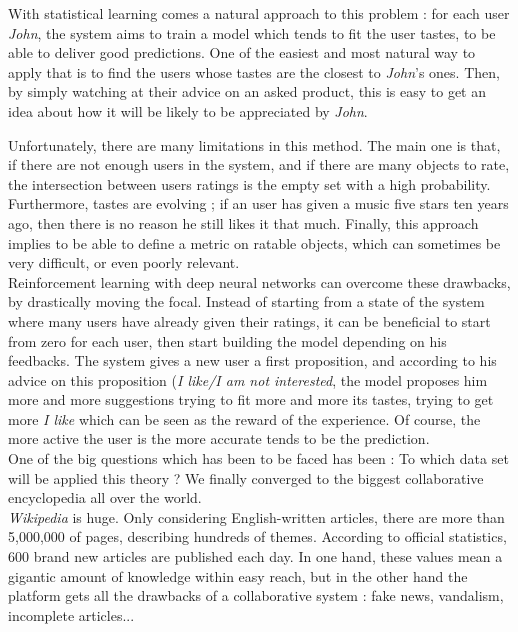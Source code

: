 \documentclass[11pt]{article}
\theoremstyle{plain}
\theoremstyle{definition}
\theoremstyle{remark}
\begin{document}
With statistical learning comes a natural approach to this problem : for each user \textit{John}, the system aims to train a model which tends to fit the user tastes, to be able to deliver good predictions. One of the easiest and most natural way to apply that is to find the users whose tastes are the closest to \textit{John}'s ones. Then, by simply watching at their advice on an asked product, this is easy to get an idea about how it will be likely to be appreciated by \textit{John}.

Unfortunately, there are many limitations in this method. The main one is that, if there are not enough users in the system, and if there are many objects to rate, the intersection between users ratings is the empty set with a high probability. Furthermore, tastes are evolving ; if an user has given a music five stars ten years ago, then there is no reason he still likes it that much. Finally, this approach implies to be able to define a metric on ratable objects, which can sometimes be very difficult, or even poorly relevant. \\

Reinforcement learning with deep neural networks can overcome these drawbacks, by drastically moving the focal. Instead of starting from a state of the system where many users have already given their ratings, it can be beneficial to start from zero for each user, then start building the model depending on his feedbacks. The system gives a new user a first proposition, and according to his advice on this proposition (\textit{I like/I am not interested}, the model proposes him more and more suggestions trying to fit more and more its tastes, trying to get more \textit{I like} which can be seen as the reward of the experience. Of course, the more active the user is the more accurate tends to be the prediction. \\

One of the big questions which has been to be faced has been : To which data set will be applied this theory ? We finally converged to the biggest collaborative encyclopedia all over the world. \\

\textit{Wikipedia} is huge. Only considering English-written articles, there are more than 5,000,000 of pages, describing hundreds of themes. According to official statistics, 600 brand new articles are published each day. In one hand, these values mean a gigantic amount of knowledge within easy reach, but in the other hand the platform gets all the drawbacks of a collaborative system : fake news, vandalism, incomplete articles... 
\end{document}
